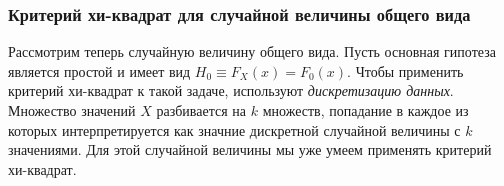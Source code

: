 \subsubsection{Критерий хи-квадрат для случайной величины общего вида}
Рассмотрим теперь случайную величину общего вида. Пусть основная гипотеза
является простой и имеет вид $H_0 \equiv F_X(x) = F_0(x)$. Чтобы применить
критерий хи-квадрат к такой задаче, используют \textit{дискретизацию данных}.
Множество значений $X$ разбивается на $k$ множеств, попадание в каждое из
которых интерпретируется как значние дискретной случайной величины с $k$
значениями. Для этой случайной величины мы уже умеем применять критерий
хи-квадрат.
